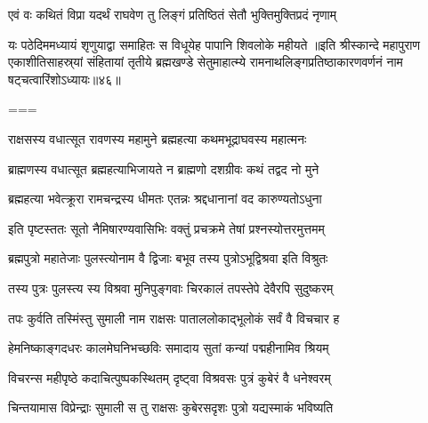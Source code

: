 \twolineshloka
{एवं वः कथितं विप्रा यदर्थं राघवेण तु}
{लिङ्गं प्रतिष्ठितं सेतौ भुक्तिमुक्तिप्रदं नृणाम्}%

\twolineshloka
{यः पठेदिममध्यायं शृणुयाद्वा समाहितः}
{स विधूयेह पापानि शिवलोके महीयते}%
॥इति श्रीस्कान्दे महापुराण एकाशीतिसाहस्र्यां संहितायां तृतीये ब्रह्मखण्डे सेतुमाहात्म्ये रामनाथलिङ्गप्रतिष्ठाकारणवर्णनं नाम षट्चत्वारिंशोऽध्यायः॥४६॥

===


\vakta{}
\shrota{}
\tags{}
\notes{}

\storymeta





\twolineshloka
{राक्षसस्य वधात्सूत रावणस्य महामुने}
{ब्रह्महत्या कथमभूद्राघवस्य महात्मनः}%

\twolineshloka
{ब्राह्मणस्य वधात्सूत ब्रह्महत्याभिजायते}
{न ब्राह्मणो दशग्रीवः कथं तद्वद नो मुने}%

\twolineshloka
{ब्रह्महत्या भवेत्क्रूरा रामचन्द्रस्य धीमतः}
{एतन्नः श्रद्दधानानां वद कारुण्यतोऽधुना}%

\twolineshloka
{इति पृष्टस्ततः सूतो नैमिषारण्यवासिभिः}
{वक्तुं प्रचक्रमे तेषां प्रश्नस्योत्तरमुत्तमम्}%


\twolineshloka
{ब्रह्मपुत्रो महातेजाः पुलस्त्योनाम वै द्विजाः}
{बभूव तस्य पुत्रोऽभूद्विश्रवा इति विश्रुतः}%

\twolineshloka
{तस्य पुत्रः पुलस्त्य स्य विश्रवा मुनिपुङ्गवाः}
{चिरकालं तपस्तेपे देवैरपि सुदुष्करम्}%

\twolineshloka
{तपः कुर्वति तस्मिंस्तु सुमाली नाम राक्षसः}
{पाताललोकाद्भूलोकं सर्वं वै विचचार ह}%

\twolineshloka
{हेमनिष्काङ्गदधरः कालमेघनिभच्छविः}
{समादाय सुतां कन्यां पद्महीनामिव श्रियम्}%

\twolineshloka
{विचरन्स महीपृष्ठे कदाचित्पुष्पकस्थितम्}
{दृष्ट्वा विश्रवसः पुत्रं कुबेरं वै धनेश्वरम्}%

\twolineshloka
{चिन्तयामास विप्रेन्द्राः सुमाली स तु राक्षसः}
{कुबेरसदृशः पुत्रो यद्यस्माकं भविष्यति}%


